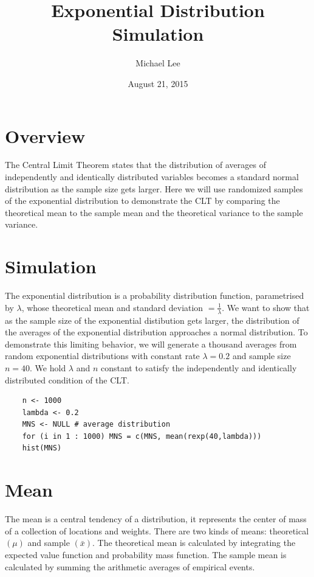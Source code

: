\documentclass[11pt]{article} %
\title{Exponential Distribution Simulation}
\author{Michael Lee}
\date{August 21, 2015} %
\begin{document}
\maketitle

\section{Overview}
  The Central Limit Theorem states that the distribution of averages of independently and identically distributed variables becomes a standard normal distribution as the sample size gets larger. Here we will use randomized samples of the exponential distribution to demonstrate the CLT by comparing the theoretical mean to the sample mean and the theoretical variance to the sample variance.

\section{Simulation}
	The exponential distribution is a probability distribution function, parametrised by $\lambda$, whose theoretical mean and standard deviation $ = \frac{1}{\lambda}$. We want to show that as the sample size of the exponential distibution gets larger, the distribution of the averages of the exponential distribution approaches a normal distribution. To demonstrate this limiting behavior, we will generate a thousand averages from random exponential distributions with constant rate $\lambda = 0.2$ and sample size $n = 40$. We hold $\lambda$ and $n$ constant to satisfy the independently and identically distributed condition of the CLT.

\begin{lstlisting}
	n <- 1000 
	lambda <- 0.2 
	MNS <- NULL # average distribution
	for (i in 1 : 1000) MNS = c(MNS, mean(rexp(40,lambda)))  
	hist(MNS) 
\end{lstlisting}

\section{Mean}

The mean is a central tendency of a distribution, it represents the center of mass of a collection of locations and weights. There are two kinds of means: theoretical $(\mu)$ and sample $(\bar{x})$. The theoretical mean is calculated by integrating the expected value function and probability mass function. The sample mean is calculated by summing the arithmetic averages of empirical events.  
\end{document}
